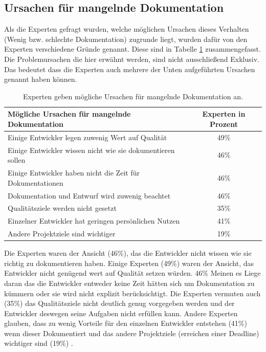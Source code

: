 \documentclass[a4paper,12pt]{scrartcl}
\begin{document}
\subsection{Ursachen für mangelnde Dokumentation}
Als die Experten gefragt wurden, welche möglichen Ursachen dieses Verhalten (Wenig bzw. schlechte Dokumentation) zugrunde liegt, wurden dafür von den Experten verschiedene Gründe genannt. Diese sind in Tabelle \ref{UrsachenTabelle} zusammengefasst. Die Problemursachen die hier erwähnt werden, sind nicht ausschließend Exklusiv. Das bedeutet dass die Experten auch mehrere der Unten aufgeführten Ursachen genannt haben können.
\begin{table}[htb]
\begin{tabular}{|l|c|}\hline
\rule{0pt}{15pt}\textbf{Mögliche Ursachen für mangelnde Dokumentation}  & \textbf{Experten in Prozent}
\\
\hline
\rule{0pt}{15pt} Einige Entwickler legen zuwenig Wert auf Qualität & 49\% \\ 
\hline
\rule{0pt}{15pt} Einige Entwickler wissen nicht wie sie dokumentieren sollen & 46\%\\
\hline
\rule{0pt}{15pt} Einige Entwickler haben nicht die Zeit für Dokumentationen & 46\%\\
\hline
\rule{0pt}{15pt} Dokumentation und Entwurf wird zuwenig beachtet & 46\%\\
\hline
\rule{0pt}{15pt} Qualitätsziele werden nicht gesetzt & 35\%\\
\hline
\rule{0pt}{15pt} Einzelner Entwickler hat geringen persönlichen Nutzen & 41\%\\
\hline
\rule{0pt}{15pt} Andere Projektziele sind wichtiger & 19\%\\
\hline
\end{tabular}
\caption{Experten geben mögliche Ursachen für mangelnde Dokumentation an.}
\label{UrsachenTabelle}
\end{table}
Die Experten waren der Ansicht (46\%), das die Entwickler nicht wissen wie sie richtig zu dokumentieren haben. Einige Experten (49\%) waren der Ansicht, das Entwickler nicht genügend wert auf Qualität setzen würden. 46\% Meinen es Liege daran das die Entwickler entweder keine Zeit hätten sich um Dokumentation zu kümmern oder sie wird nicht explizit berücksichtigt. Die Experten vermuten auch (35\%) das Qualitätsziele nicht deutlich genug vorgegeben werden und der Entwickler deswegen seine Aufgaben nicht erfüllen kann. Andere Experten glauben, dass zu wenig Vorteile für den einzelnen Entwickler entstehen (41\%) wenn dieser Dokumentiert und das andere Projektziele (erreichen einer Deadline) wichtiger sind (19\%) \cite{Prause2012}.
\end{document}

